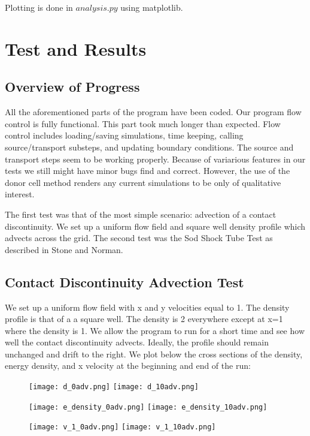\documentclass[11pt]{article}
\begin{document}
    Plotting is done in $analysis.py$ using matplotlib.

\section{Test and Results}
\subsection{Overview of Progress}

    All the aforementioned parts of the program have been coded. Our program flow control is fully functional. This part took much longer than expected. Flow control includes loading/saving simulations, time keeping, calling source/transport substeps, and updating boundary conditions. The source and transport steps seem to be working properly. Because of variarious features in our tests we still might have minor bugs find and correct. However, the use of the donor cell method renders any current simulations to be only of qualitative interest.

The first test was that of the most simple scenario: advection of a contact discontinuity. We set up a uniform flow field and square well density profile which advects across the grid. The second test was the Sod Shock Tube Test as described in Stone and Norman.

\subsection{Contact Discontinuity Advection Test}
We set up a uniform flow field with x and y velocities equal to 1. The density profile is that of a a square well. The density is 2 everywhere except at x=1 where the density is 1. We allow the program to run for a short time and see how well the contact discontinuity advects. Ideally, the profile should remain unchanged and drift to the right. We plot below the cross sections of the density, energy density, and x velocity at the beginning and end of the run:
\begin{figure}[h]
  \texttt{[image: d\_0adv.png]}
    \texttt{[image: d\_10adv.png]}
\end{figure}
\begin{figure}[h]
  \texttt{[image: e\_density\_0adv.png]}
    \texttt{[image: e\_density\_10adv.png]}
\end{figure}
\begin{figure}[h]
  \texttt{[image: v\_1\_0adv.png]}
    \texttt{[image: v\_1\_10adv.png]}
\end{figure}
\clearpage
\end{document}
